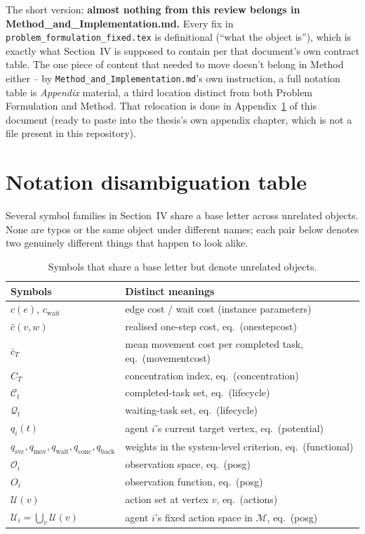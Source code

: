 \documentclass[11pt]{article}
\begin{document}
The short version: \textbf{almost nothing from this review belongs in
Method\_and\_Implementation.md.} Every fix in
\texttt{problem\_formulation\_fixed.tex} is definitional (``what the object
is''), which is exactly what Section~IV is supposed to contain per that
document's own contract table. The one piece of content that needed to move
doesn't belong in Method either -- by \texttt{Method\_and\_Implementation.md}'s
own instruction, a full notation table is \emph{Appendix} material, a third
location distinct from both Problem Formulation and Method. That relocation
is done in Appendix~\ref{app:notation} of this document (ready to paste into
the thesis's own appendix chapter, which is not a file present in this
repository).

\appendix
\section{Notation disambiguation table}
\label{app:notation}

Several symbol families in Section~IV share a base letter across unrelated
objects. None are typos or the same object under different names; each pair
below denotes two genuinely different things that happen to look alike.

\begin{table}[h]
  \centering
  \caption{Symbols that share a base letter but denote unrelated objects.}
  \label{tab:notation}
  \begin{tabular}{ll}
    \toprule
    Symbols & Distinct meanings \\
    \midrule
    $c(e)$, $c_{\mathrm{wait}}$ & edge cost / wait cost (instance parameters) \\
    $\hat{c}(v,w)$ & realised one-step cost, eq.~(onestepcost) \\
    $\bar{c}_T$ & mean movement cost per completed task, eq.~(movementcost) \\
    $C_T$ & concentration index, eq.~(concentration) \\
    $\mathcal{C}_t$ & completed-task set, eq.~(lifecycle) \\
    \addlinespace
    $\mathcal{Q}_t$ & waiting-task set, eq.~(lifecycle) \\
    $q_i(t)$ & agent $i$'s current target vertex, eq.~(potential) \\
    $q_{\mathrm{svc}}, q_{\mathrm{mov}}, q_{\mathrm{wait}}, q_{\mathrm{conc}}, q_{\mathrm{back}}$
      & weights in the system-level criterion, eq.~(functional) \\
    \addlinespace
    $\mathcal{O}_i$ & observation space, eq.~(posg) \\
    $O_i$ & observation function, eq.~(posg) \\
    \addlinespace
    $\mathcal{U}(v)$ & action set at vertex $v$, eq.~(actions) \\
    $\mathcal{U}_i = \bigcup_{v} \mathcal{U}(v)$ & agent $i$'s fixed action space in $\mathcal{M}$, eq.~(posg) \\
    \bottomrule
  \end{tabular}
\end{table}
\end{document}

